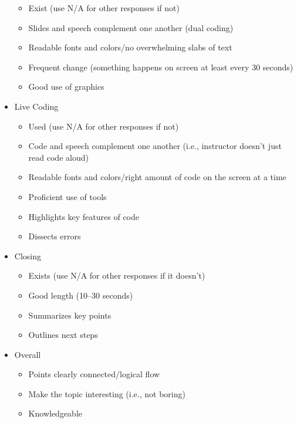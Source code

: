 \begin{itemize}
  \begin{itemize}
  \tightlist
  \item
    Exist (use N/A for other responses if not)
  \item
    Slides and speech complement one another (dual coding)
  \item
    Readable fonts and colors/no overwhelming slabs of text
  \item
    Frequent change (something happens on screen at least every 30 seconds)
  \item
    Good use of graphics
  \end{itemize}
\item
  Live Coding

  \begin{itemize}
  \tightlist
  \item
    Used (use N/A for other responses if not)
  \item
    Code and speech complement one another (i.e., instructor doesn't just read code aloud)
  \item
    Readable fonts and colors/right amount of code on the screen at a time
  \item
    Proficient use of tools
  \item
    Highlights key features of code
  \item
    Dissects errors
  \end{itemize}
\item
  Closing

  \begin{itemize}
  \tightlist
  \item
    Exists (use N/A for other responses if it doesn't)
  \item
    Good length (10--30 seconds)
  \item
    Summarizes key points
  \item
    Outlines next steps
  \end{itemize}
\item
  Overall

  \begin{itemize}
  \tightlist
  \item
    Points clearly connected/logical flow
  \item
    Make the topic interesting (i.e., not boring)
  \item
    Knowledgeable
  \end{itemize}
\end{itemize}
